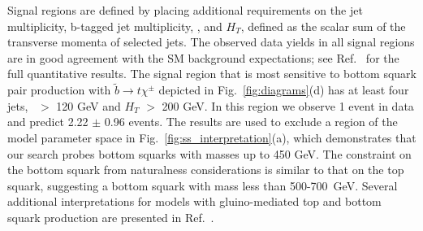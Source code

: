 Signal regions are defined by placing additional requirements on the jet multiplicity, b-tagged jet multiplicity, 
\met, and $H_T$, defined as the scalar sum of the transverse momenta of selected jets. 
The observed data yields in all signal regions are in good agreement with the SM background expectations;
see Ref.~\cite{ref:ss} for the full quantitative results. The signal region that is most sensitive to 
bottom squark pair production with $\tilde{b}\to t \chi^{\pm}$ depicted in Fig.~\ref{fig:diagrams}(d) 
has at least four jets, \met\ $>$ 120 GeV and
$H_T$ $>$ 200 GeV. In this region we observe 1 event in data and predict 2.22 $\pm$ 0.96 events.
The results are used to exclude a region of the model parameter space in Fig.~\ref{fig:ss_interpretation}(a),
which demonstrates that our search probes bottom squarks with masses up to 450 GeV.
The constraint on the bottom squark from naturalness considerations is similar to that on the top squark, 
suggesting a bottom squark with mass less than 500-700~GeV. 
Several additional interpretations for models with gluino-mediated top and 
bottom squark production are presented in Ref.~\cite{ref:ss}.

%



